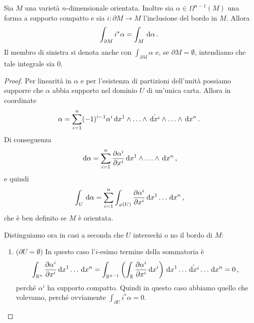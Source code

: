 \begin{theorem} [Stokes] \label{thm:Stokes} 
	Sia $M$ una varietà $n$-dimensionale orientata. Inoltre sia $\alpha \in \Omega^{n-1}(M)$ una forma a supporto compatto e sia $i:\partial M \to M$ l'inclusione del bordo in $M$. Allora
	\begin{equation*}
		\int_{\partial M} i^*\alpha = \int_M \,\mathrm d \alpha \, \text{. }
	\end{equation*}
	Il membro di sinistra si denota anche con $\int_{\partial M} \alpha$ e, se $\partial M = \emptyset$, intendiamo che tale integrale sia 0.
\end{theorem}
\begin{proof}
	Per linearità in $\alpha$ e per l'esistenza di partizioni dell'unità possiamo supporre che $\alpha$ abbia supporto nel dominio $U$ di un'unica carta.
	Allora in coordinate
	\begin{equation*}
		\alpha = \sum_{i=1}^n (-1)^{i-1} \alpha^i \,\mathrm d x^1 \wedge \ldots \wedge \hat{\,\mathrm d x^i} \wedge \ldots \wedge \,\mathrm d x^n \, \text{. }
	\end{equation*}
	Di conseguenza
	\begin{equation*}
		\,\mathrm d \alpha = \sum_{i=1}^n \frac{\partial \alpha^i}{\partial x^i} \,\mathrm d x^1\wedge \ldots \wedge \,\mathrm d x^{n} \, \text{, }
	\end{equation*}
	e quindi
	\begin{equation*}
		\int_U \,\mathrm d \alpha = \sum_{i=1}^n \int_{\varphi(U)} \frac{\partial \alpha^i}{\partial x^i} \,\mathrm d x^1 \ldots  \,\mathrm d x^{n} \, \text{, }
	\end{equation*}
	che è ben definito se $M$ è orientata.
	
	Distinguiamo ora in casi a seconda che $U$ intersechi o no il bordo di $M$:
	\begin{enumerate}
		\item ($\partial U = \emptyset$) In questo caso l'$i$-esimo termine della sommatoria è
		\begin{equation*}
			\int_{\mathbb R^n} \frac{\partial \alpha^i}{\partial x^i} \,\mathrm d x^1 \ldots  \,\mathrm d x^{n} = \int_{\mathbb R^{n-1}} \left(\int_{\mathbb R} \frac{\partial \alpha^i}{\partial x^i} \,\mathrm d x^i \right) \,\mathrm d x^1  \ldots \hat{\,\mathrm d x^i} \ldots \,\mathrm d x^n = 0 \, \text{, }
		\end{equation*}
		perché $\alpha^i$ ha supporto compatto. Quindi in questo caso abbiamo quello che volevamo, perché ovviamente $\int_{\partial U} i^*\alpha = 0$.
		

\end{enumerate}
\end{proof}

